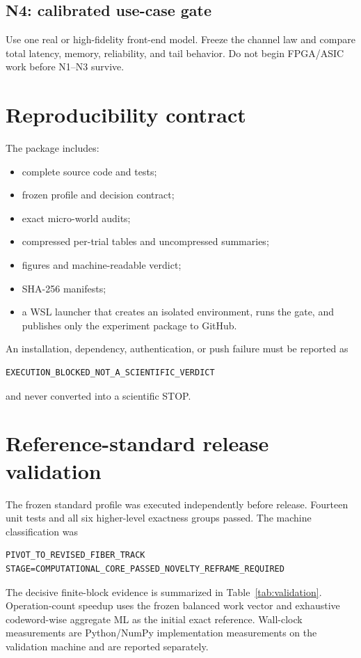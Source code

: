 \documentclass[11pt]{article}
\begin{document}
\subsection{N4: calibrated use-case gate}
Use one real or high-fidelity front-end model. Freeze the channel law and compare total latency, memory, reliability, and tail behavior. Do not begin FPGA/ASIC work before N1--N3 survive.

\section{Reproducibility contract}
The package includes:
\begin{itemize}
\item complete source code and tests;
\item frozen profile and decision contract;
\item exact micro-world audits;
\item compressed per-trial tables and uncompressed summaries;
\item figures and machine-readable verdict;
\item SHA-256 manifests;
\item a WSL launcher that creates an isolated environment, runs the gate, and publishes only the experiment package to GitHub.
\end{itemize}
An installation, dependency, authentication, or push failure must be reported as
\begin{lstlisting}[basicstyle=\ttfamily\small]
EXECUTION_BLOCKED_NOT_A_SCIENTIFIC_VERDICT
\end{lstlisting}
and never converted into a scientific STOP.


\section{Reference-standard release validation}
The frozen standard profile was executed independently before release. Fourteen unit tests and all six higher-level exactness groups passed. The machine classification was
\begin{lstlisting}[basicstyle=\ttfamily\small]
PIVOT_TO_REVISED_FIBER_TRACK
STAGE=COMPUTATIONAL_CORE_PASSED_NOVELTY_REFRAME_REQUIRED
\end{lstlisting}
The decisive finite-block evidence is summarized in Table~\ref{tab:validation}. Operation-count speedup uses the frozen balanced work vector and exhaustive codeword-wise aggregate ML as the initial exact reference. Wall-clock measurements are Python/NumPy implementation measurements on the validation machine and are reported separately.
\end{document}
